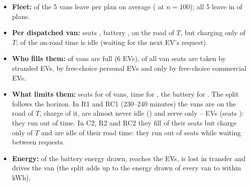 \begin{itemize}
  \item \textbf{Fleet:} \UFleetMean\pct{} of the 5 vans leave per plan on average (\UFleetHundred\pct{} at $n=100$); all 5 leave in \UFleetAll\pct{} of plans.
  \item \textbf{Per dispatched van:} seats \USeatMean\pct, battery \UBattMean\pct, on the road \UOnRoadMean\pct{} of $T$, but charging only \UChargeMean\pct{} of $T$; \UIdleShareMean\pct{} of the on-road time is idle (waiting for the next EV's request).
  \item \textbf{Who fills them:} \VansFull\pct{} of vans are full (6 EVs). \SeatsStranded\pct{} of all van seats are taken by stranded EVs, \SeatsPersFree\pct{} by free-choice personal EVs and only \SeatsCommFree\pct{} by free-choice commercial EVs.
  \item \textbf{What limits them:} seats for \TightSeats\pct{} of vans, time for \TightTime\pct{}, the battery for \TightBatt\pct. The split follows the horizon. In R1 and RC1 (230--240 minutes) the vans are on the road \UOnRoadShort\pct{} of $T$, charge \UChargeShort\pct{} of it, are almost never idle (\UIdleShareShort\pct) and serve only \ShortVanStopsMin--\ShortVanStopsMax{} EVs (seats \USeatShort\pct): they run out of time. In C2, R2 and RC2 they fill \USeatLong\pct{} of their seats but charge only \UChargeLong\pct{} of $T$ and are idle \UIdleShareLong\pct{} of their road time: they run out of seats while waiting between requests.
  \item \textbf{Energy:} of the battery energy drawn, \UVanDelivShare\pct{} reaches the EVs, \UVanLossShare\pct{} is lost in transfer and \UVanDriveShare\pct{} drives the van (the split adds up to the energy drawn of every van to within \UVanEnergyCheck{} kWh).
\end{itemize}



